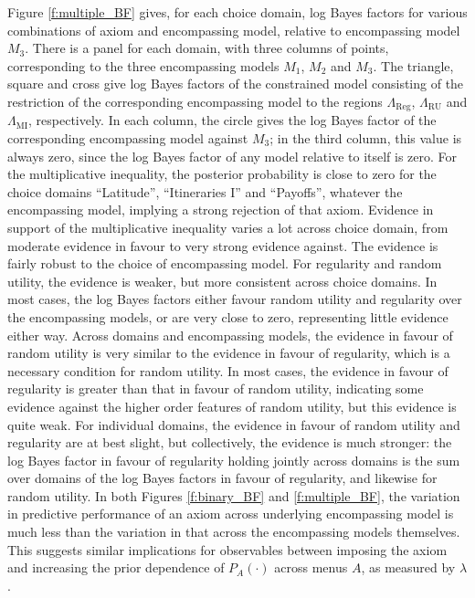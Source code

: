 \documentclass[11pt,letter]{article}
\newcommand{\menus}{menus}
\begin{document}
Figure \ref{f:multiple_BF} gives, for each choice domain, log Bayes factors for various combinations of axiom and encompassing model, relative to encompassing model $M_3$.
There is a panel for each domain, with three columns of points, corresponding to the three encompassing models $M_1$, $M_2$ and $M_3$.
The triangle, square and cross give log Bayes factors of the constrained model consisting of the restriction of the corresponding encompassing model to the regions $\Lambda_{\mathrm{Reg}}$, $\Lambda_{\mathrm{RU}}$ and $\Lambda_{\mathrm{MI}}$, respectively.
In each column, the circle gives the log Bayes factor of the corresponding encompassing model against $M_3$; in the third column, this value is always zero, since the log Bayes factor of any model relative to itself is zero.
For the multiplicative inequality, the posterior probability is close to zero for the choice domains ``Latitude'', ``Itineraries I'' and ``Payoffs'', whatever the encompassing model, implying a strong rejection of that axiom.
Evidence in support of the multiplicative inequality varies a lot across choice domain, from moderate evidence in favour to very strong evidence against.
The evidence is fairly robust to the choice of encompassing model.
For regularity and random utility, the evidence is weaker, but more consistent across choice domains.
In most cases, the log Bayes factors either favour random utility and regularity over the encompassing models, or are very close to zero, representing little evidence either way.
Across domains and encompassing models, the evidence in favour of random utility is very similar to the evidence in favour of regularity, which is a necessary condition for random utility.
In most cases, the evidence in favour of regularity is greater than that in favour of random utility, indicating some evidence against the higher order features of random utility, but this evidence is quite weak.
For individual domains, the evidence in favour of random utility and regularity are at best slight, but collectively, the evidence is much stronger: the log Bayes factor in favour of regularity holding jointly across domains is the sum over domains of the log Bayes factors in favour of regularity, and likewise for random utility.
In both Figures \ref{f:binary_BF} and \ref{f:multiple_BF}, the variation in predictive performance of an axiom across underlying encompassing model is much less than the variation in that across the encompassing models themselves.
This suggests similar implications for observables between imposing the axiom and increasing the prior dependence of $P_A(\cdot)$ across \menus{} $A$, as measured by $\lambda$.
\end{document}
